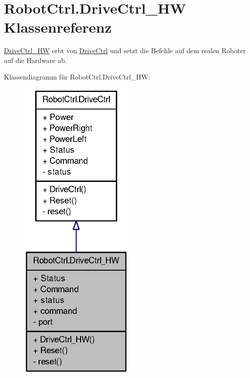 \hypertarget{class_robot_ctrl_1_1_drive_ctrl___h_w}{
\section{RobotCtrl.DriveCtrl\_\-HW Klassenreferenz}
\label{class_robot_ctrl_1_1_drive_ctrl___h_w}
}


\hyperlink{class_robot_ctrl_1_1_drive_ctrl___h_w}{DriveCtrl\_\-HW} erbt von \hyperlink{class_robot_ctrl_1_1_drive_ctrl}{DriveCtrl} und setzt die Befehle auf dem realen Roboter auf die Hardware ab.  




Klassendiagramm für RobotCtrl.DriveCtrl\_\-HW:\nopagebreak
\begin{figure}[H]
\begin{center}
\leavevmode
\includegraphics[width=162pt]{class_robot_ctrl_1_1_drive_ctrl___h_w__inherit__graph}
\end{center}
\end{figure}



